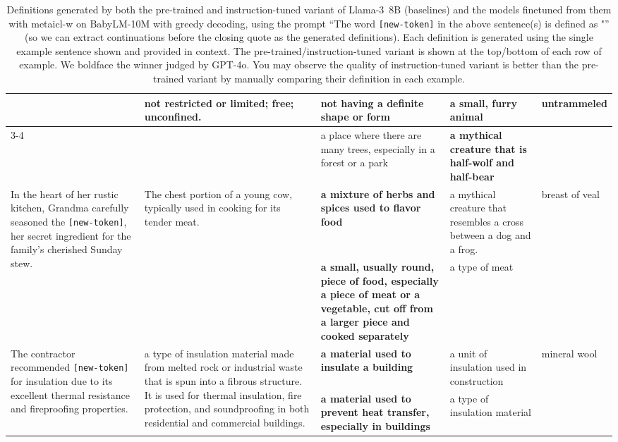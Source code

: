 \documentclass{article}
\begin{document}
\begin{table*}[t]
\begin{center}
\begin{tabular}{p{3.15cm}p{3cm}p{3.15cm}p{3.15cm}p{1.4cm}}
& \multirow{2}{=}{not restricted or limited; free; unconfined.}
& not having a definite shape or form
& a small, furry animal
& untrammeled
\\
\cmidrule{3-4}
&
& a place where there are many trees, especially in a forest or a park
& \textbf{a mythical creature that is half-wolf and half-bear}
\\
\midrule
\multirow{2}{=}{In the heart of her rustic kitchen, Grandma carefully seasoned the \texttt{[new-token]}, her secret ingredient for the family's cherished Sunday stew.}
& \multirow{2}{=}{The chest portion of a young cow, typically used in cooking for its tender meat.}
& \textbf{a mixture of herbs and spices used to flavor food}
& a mythical creature that resembles a cross between a dog and a frog.
& breast of veal
\\
\cmidrule{3-4}
&
& \textbf{a small, usually round, piece of food, especially a piece of meat or a vegetable, cut off from a larger piece and cooked separately}
& a type of meat
\\
\midrule
\multirow{2}{=}{The contractor recommended \texttt{[new-token]} for insulation due to its excellent thermal resistance and fireproofing properties.}
& \multirow{2}{=}{a type of insulation material made from melted rock or industrial waste that is spun into a fibrous structure. It is used for thermal insulation, fire protection, and soundproofing in both residential and commercial buildings.}
\vspace{1.95cm}
& \textbf{a material used to insulate a building}
& a unit of insulation used in construction
& mineral wool
\\
\cmidrule{3-4}
&
& \textbf{a material used to prevent heat transfer, especially in buildings}
& a type of insulation material
\\
\bottomrule
\end{tabular}
\end{center}
\caption{Definitions generated by both the pre-trained and instruction-tuned variant of \mbox{Llama-3 8B} (baselines) and the models finetuned from them with \ac{metaicl-w} on BabyLM-10M with greedy decoding, using the prompt ``The word \texttt{[new-token]} in the above sentence(s) is defined as "'' (so we can extract continuations before the closing quote as the generated definitions).
Each definition is generated using the single example sentence shown and provided in context.
The pre-trained/instruction-tuned variant is shown at the top/bottom of each row of example.
We boldface the winner judged by \mbox{GPT-4o}.
You may observe the quality of instruction-tuned variant is better than the pre-trained variant by manually comparing their definition in each example.}
\label{tab:defgen-definition-more}
\end{table*}
\end{document}
